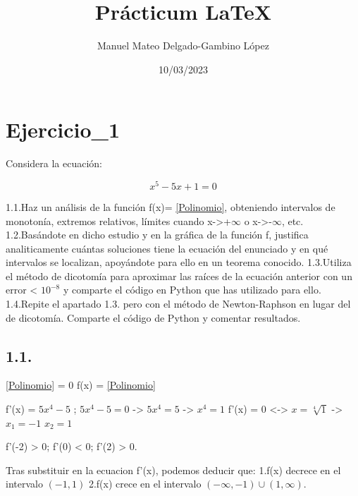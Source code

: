 \documentclass[12pt]{article}
\title{\Huge Prácticum \LaTeX}
\author{\Large Manuel Mateo Delgado-Gambino López}
\date{10/03/2023}
\begin{document}
    \maketitle

    \clearpage

    \tableofcontents

    \clearpage

    \section{Ejercicio_1}

      Considera la ecuación:

      \begin{equation}\label{Polinomio}
        x^5-5x+1=0
      \end{equation}
         
      1.1.Haz un análisis de la función f(x)= \eqref{Polinomio}, obteniendo intervalos de monotonía, extremos relativos, límites cuando x->+$\infty$ o x->-$\infty$, etc.
      1.2.Basándote en dicho estudio y en la gráfica de la función f, justifica analiticamente cuántas soluciones tiene la ecuación del enunciado y en qué intervalos se localizan, apoyándote para ello en un teorema conocido.
      1.3.Utiliza el método de dicotomía para aproximar las raíces de la ecuación anterior con un error < $10^{-8}$ y comparte el código en Python que has utilizado para ello.
      1.4.Repite el apartado 1.3. pero con el método de Newton-Raphson en lugar del de dicotomía. Comparte el código de Python y comentar resultados.

      \vspace{1.5cm}
      
      \subsection{1.1.}

        \eqref{Polinomio} = 0
        f(x) = \eqref{Polinomio}

        \vspace

        f'(x) = $5x^4-5$ ; $5x^4-5 = 0$ -> $5x^4 = 5$ -> $x^4 = 1$
        f'(x) = 0 <-> $x = \sqrt[4]{1}$ -> $x_{1} = -1$ $x_{2} = 1$

        f'(-2) > 0; f'(0) < 0; f'(2) > 0.

        Tras substituir en la ecuacion f'(x), podemos deducir que:
        1.f(x) decrece en el intervalo $(-1, 1)$
        2.f(x) crece en el intervalo $(-\infty, -1) \cup (1, \infty)$.
\end{document}
